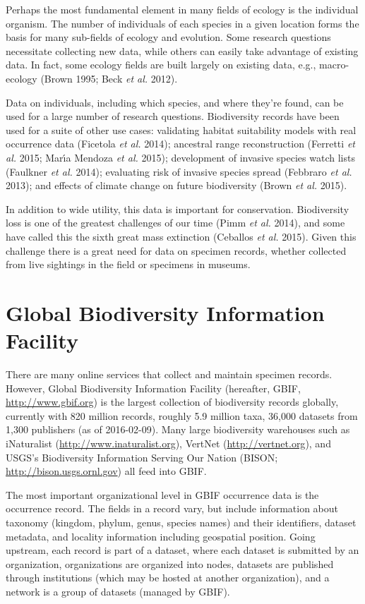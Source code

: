\documentclass[3p]{elsarticle} %
\begin{document}
Perhaps the most fundamental element in many fields of ecology is the
individual organism. The number of individuals of each species in a
given location forms the basis for many sub-fields of ecology and
evolution. Some research questions necessitate collecting new data,
while others can easily take advantage of existing data. In fact, some
ecology fields are built largely on existing data, e.g., macro-ecology
(Brown 1995; Beck \emph{et al.} 2012).

Data on individuals, including which species, and where they're found,
can be used for a large number of research questions. Biodiversity
records have been used for a suite of other use cases: validating
habitat suitability models with real occurrence data (Ficetola \emph{et
al.} 2014); ancestral range reconstruction (Ferretti \emph{et al.} 2015;
Marı́a Mendoza \emph{et al.} 2015); development of invasive species watch
lists (Faulkner \emph{et al.} 2014); evaluating risk of invasive species
spread (Febbraro \emph{et al.} 2013); and effects of climate change on
future biodiversity (Brown \emph{et al.} 2015).

In addition to wide utility, this data is important for conservation.
Biodiversity loss is one of the greatest challenges of our time (Pimm
\emph{et al.} 2014), and some have called this the sixth great mass
extinction (Ceballos \emph{et al.} 2015). Given this challenge there is
a great need for data on specimen records, whether collected from live
sightings in the field or specimens in museums.

\hypertarget{global-biodiversity-information-facility}{%
\section{Global Biodiversity Information
Facility}\label{global-biodiversity-information-facility}}

There are many online services that collect and maintain specimen
records. However, Global Biodiversity Information Facility (hereafter,
GBIF, \url{http://www.gbif.org}) is the largest collection of
biodiversity records globally, currently with 820 million records,
roughly 5.9 million taxa, 36,000 datasets from 1,300 publishers (as of
2016-02-09). Many large biodiversity warehouses such as iNaturalist
(\url{http://www.inaturalist.org}), VertNet (\url{http://vertnet.org}),
and USGS's Biodiversity Information Serving Our Nation (BISON;
\url{http://bison.usgs.ornl.gov}) all feed into GBIF.

The most important organizational level in GBIF occurrence data is the
occurrence record. The fields in a record vary, but include information
about taxonomy (kingdom, phylum, genus, species names) and their
identifiers, dataset metadata, and locality information including
geospatial position. Going upstream, each record is part of a dataset,
where each dataset is submitted by an organization, organizations are
organized into nodes, datasets are published through institutions (which
may be hosted at another organization), and a network is a group of
datasets (managed by GBIF).
\end{document}
